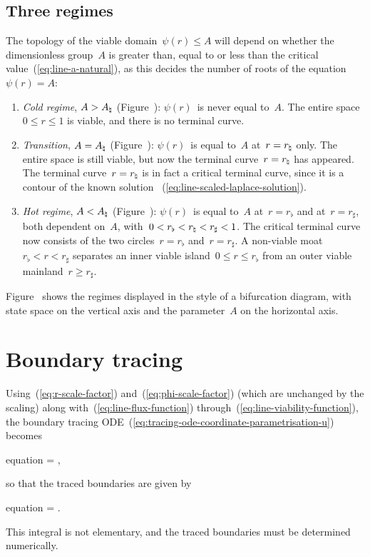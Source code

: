 \subsection{Three regimes}
\label{sec:polar.viable.regimes}

The topology of the viable domain~$\psi (r) \le A$ will depend
on whether the dimensionless group~$A$ is
greater than, equal to or less than
the critical value~(\ref{eq:line-a-natural}),
as this decides the number of roots of the equation~$\psi (r) = A$:
\begin{enumerate}
  \item
    \emph{Cold regime}, $A > A_\natural$ (Figure~\tbd):
    $\psi (r)$~is never equal to~$A$.
    The entire space~$0 \le r \le 1$ is viable,
    and there is no terminal curve.
  \item
    \emph{Transition}, $A = A_\natural$ (Figure~\tbd):
    $\psi (r)$~is equal to~$A$ at~$r = r_\natural$ only.
    The entire space is still viable,
    but now the terminal curve~$r = r_\natural$ has appeared.
    The terminal curve~$r = r_\natural$ is in fact a critical terminal curve,
    since it is a contour of the known solution~%
      (\ref{eq:line-scaled-laplace-solution}).
  \item
    \emph{Hot regime}, $A < A_\natural$ (Figure~\tbd):
    $\psi (r)$~is equal to~$A$ at~$r = r_\flat$
    and at~$r = r_\sharp$,
    both dependent on~$A$,
    with~$0 <  r_\flat < r_\natural < r_\sharp < 1$.
    The critical terminal curve now consists of
    the two circles~$r = r_\flat$ and~$r = r_\sharp$.
    A non-viable moat~$r_\flat < r < r_\sharp$
    separates an inner viable island~$0 \le r \le r_\flat$
    from an outer viable mainland~$r \ge r_\sharp$.
\end{enumerate}
Figure~\tbd{}
shows the regimes displayed in the style of a bifurcation diagram,
with state space on the vertical axis
and the parameter~$A$ on the horizontal axis.

\section{Boundary tracing}
\label{sec:polar.tracing}

Using~(\ref{eq:r-scale-factor}) and~(\ref{eq:phi-scale-factor})
(which are unchanged by the scaling)
along with~(\ref{eq:line-flux-function})
through~(\ref{eq:line-viability-function}),
the boundary tracing ODE~(\ref{eq:tracing-ode-coordinate-parametrisation-u})
becomes
\begin{important}{equation}
   = \mp {},
  \label{eq:line-tracing-ode-coordinate-parametrisation-r}
\end{important}
so that the traced boundaries are given by
\begin{important}{equation}
  \phi = \mp \int {}.
  \label{eq:line-traced-boundary-integral}
\end{important}
This integral is not elementary,
and the traced boundaries must be determined numerically.


